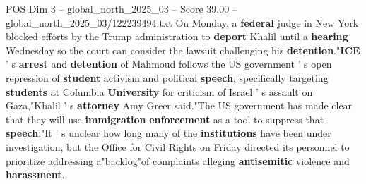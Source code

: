 \begin{textsample}{POS Dim 3 – global\_north\_2025\_03 – Score 39.00 – global\_north\_2025\_03/122239494.txt}
On Monday, a \textbf{federal} judge in New York blocked efforts by the Trump administration to \textbf{deport} Khalil until a \textbf{hearing} Wednesday so the court can consider the lawsuit challenging his \textbf{detention}."\textbf{ICE} ' s \textbf{arrest} and \textbf{detention} of Mahmoud follows the US government ' s open repression of \textbf{student} activism and political \textbf{speech}, specifically targeting \textbf{students} at Columbia \textbf{University} for criticism of Israel ' s assault on Gaza,"Khalil ' s \textbf{attorney} Amy Greer said."The US government has made clear that they will use \textbf{immigration} \textbf{enforcement} as a tool to suppress that \textbf{speech}."It ' s unclear how long many of the \textbf{institutions} have been under investigation, but the Office for Civil Rights on Friday directed its personnel to prioritize addressing a"backlog"of complaints alleging \textbf{antisemitic} violence and \textbf{harassment}.

\end{textsample}
